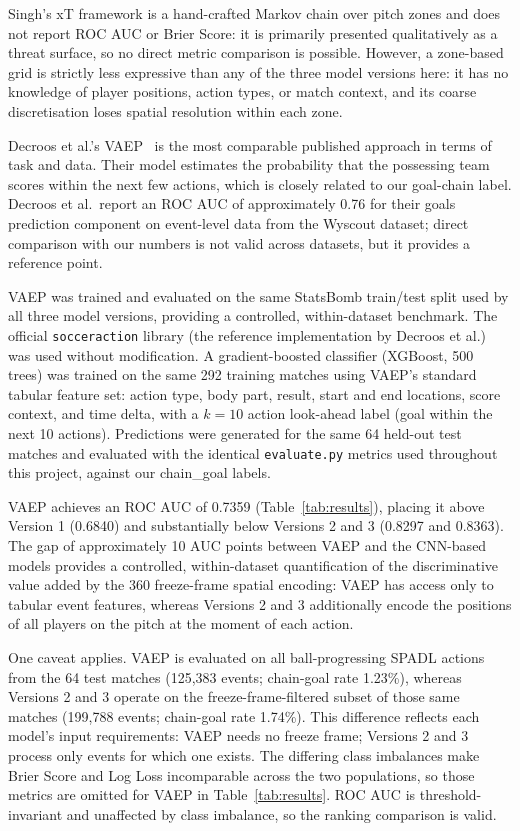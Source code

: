 Singh's xT framework is a hand-crafted Markov chain over pitch zones and does not report ROC AUC or Brier Score: it is primarily presented qualitatively as a threat surface, so no direct metric comparison is possible. However, a zone-based grid is strictly less expressive than any of the three model versions here: it has no knowledge of player positions, action types, or match context, and its coarse discretisation loses spatial resolution within each zone.

Decroos et al.'s VAEP~\cite{decroos2019} is the most comparable published approach in terms of task and data. Their model estimates the probability that the possessing team scores within the next few actions, which is closely related to our goal-chain label. Decroos et al.\ report an ROC AUC of approximately 0.76 for their goals prediction component on event-level data from the Wyscout dataset; direct comparison with our numbers is not valid across datasets, but it provides a reference point.

VAEP was trained and evaluated on the same StatsBomb train/test split used by all three model versions, providing a controlled, within-dataset benchmark. The official \texttt{socceraction} library (the reference implementation by Decroos et al.) was used without modification. A gradient-boosted classifier (XGBoost, 500 trees) was trained on the same 292 training matches using VAEP's standard tabular feature set: action type, body part, result, start and end locations, score context, and time delta, with a $k = 10$ action look-ahead label (goal within the next 10 actions). Predictions were generated for the same 64 held-out test matches and evaluated with the identical \texttt{evaluate.py} metrics used throughout this project, against our chain\_goal labels.

VAEP achieves an ROC AUC of 0.7359 (Table~\ref{tab:results}), placing it above Version 1 (0.6840) and substantially below Versions 2 and 3 (0.8297 and 0.8363). The gap of approximately 10 AUC points between VAEP and the CNN-based models provides a controlled, within-dataset quantification of the discriminative value added by the 360 freeze-frame spatial encoding: VAEP has access only to tabular event features, whereas Versions 2 and 3 additionally encode the positions of all players on the pitch at the moment of each action. 

One caveat applies. VAEP is evaluated on all ball-progressing SPADL actions from the 64 test matches (125,383 events; chain-goal rate 1.23\%), whereas Versions 2 and 3 operate on the freeze-frame-filtered subset of those same matches (199,788 events; chain-goal rate 1.74\%). This difference reflects each model's input requirements: VAEP needs no freeze frame; Versions 2 and 3 process only events for which one exists. The differing class imbalances make Brier Score and Log Loss incomparable across the two populations, so those metrics are omitted for VAEP in Table~\ref{tab:results}. ROC AUC is threshold-invariant and unaffected by class imbalance, so the ranking comparison is valid.


